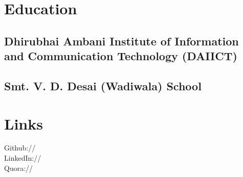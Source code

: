 \documentclass[]{deedy-resume-openfont}
\begin{document}
\begin{minipage}[t]{0.33\textwidth} 


\section{Education} 

\subsection{\texorpdfstring{Dhirubhai Ambani \newline Institute of Information \newline and Communication \newline Technology (DAIICT)}{}}
\sectionsep

\subsection{\texorpdfstring{Smt. V. D. Desai \newline (Wadiwala) School}{}}
\sectionsep


\section{Links} 
\faGithub \hspace*{1pt} Github:// \href{https://github.com/foxtrot9}{} \\
\faLinkedinSign \hspace*{1pt} LinkedIn://  \href{https://www.linkedin.com/in/Mit-Naria}{} \\
Quora://  \href{https://www.quora.com/profile/Mit-Naria}{} \\
\sectionsep


\end{minipage}
\end{document}
